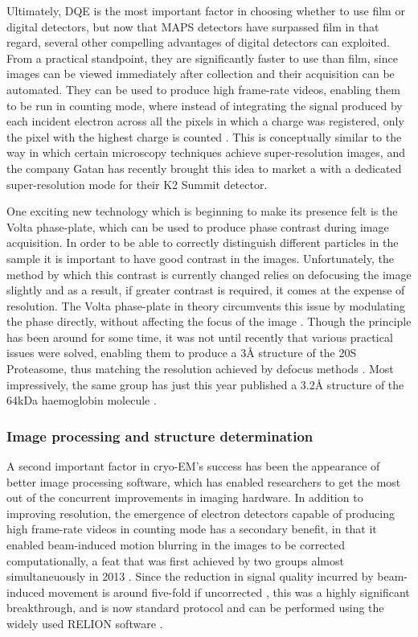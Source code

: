 \documentclass[a4paper,11pt,twoside,openright]{scrbook}
\begin{document}
Ultimately, DQE is the most important factor in choosing whether to use film or digital detectors, but now that MAPS detectors have surpassed film in that regard, several other compelling advantages of digital detectors can exploited. From a practical standpoint, they are significantly faster to use than film, since images can be viewed immediately after collection and their acquisition can be automated. They can be used to produce high frame-rate videos, enabling them to be run in counting mode, where instead of integrating the signal produced by each incident electron across all the pixels in which a charge was registered, only the pixel with the highest charge is counted \cite{McMullan2009a}. This is conceptually similar to the way in which certain microscopy techniques achieve super-resolution images, and the company Gatan has recently brought this idea to market a with a dedicated super-resolution mode for their K2 Summit detector.

One exciting new technology which is beginning to make its presence felt is the Volta phase-plate, which can be used to produce phase contrast during image acquisition. In order to be able to correctly distinguish different particles in the sample it is important to have good contrast in the images. Unfortunately, the method by which this contrast is currently changed relies on defocusing the image slightly and as a result, if greater contrast is required, it comes at the expense of resolution. The Volta phase-plate in theory circumvents this issue by modulating the phase directly, without affecting the focus of the image \cite{Danev2014}. Though the principle has been around for some time, it was not until recently that various practical issues were solved, enabling them to produce a 3Å structure of the 20S Proteasome, thus matching the resolution achieved by defocus methods \cite{Danev2016}. Most impressively, the same group has just this year published a 3.2Å structure of the 64kDa haemoglobin molecule \cite{Khoshouei2017}.

\subsubsection{Image processing and structure determination}
A second important factor in cryo-EM's success has been the appearance of better image processing software, which has enabled researchers to get the most out of the concurrent improvements in imaging hardware. In addition to improving resolution, the emergence of electron detectors capable of producing high frame-rate videos in counting mode has a secondary benefit, in that it enabled beam-induced motion blurring in the images to be corrected computationally, a feat that was first achieved by two groups almost simultaneuously in 2013 \cite{Bai2013, Li2013}. Since the reduction in signal quality incurred by beam-induced movement is around five-fold if uncorrected \cite{Henderson1985}, this was a highly significant breakthrough, and is now standard protocol and can be performed using the widely used RELION software \cite{Scheres2012,Scheres2014}.
\end{document}
